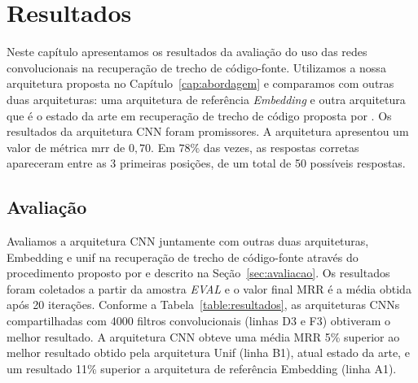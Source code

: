 \chapter{Resultados}
\label{cap:resultados}

Neste capítulo apresentamos os resultados da avaliação do uso das redes convolucionais na recuperação de trecho de código-fonte. Utilizamos a nossa arquitetura proposta no Capítulo~\ref{cap:abordagem} e comparamos com outras duas arquiteturas: uma arquitetura de referência \textit{Embedding} e outra arquitetura que é o estado da arte em recuperação de trecho de código proposta por \cite{cambronero-deep-learning-code-search:2019}. Os resultados da arquitetura CNN foram promissores. A arquitetura apresentou um valor de métrica \acrfull{mrr} de $0,70$. Em $78\%$ das vezes, as respostas corretas apareceram entre as 3 primeiras posições, de um total de 50 possíveis respostas.

\section{Avaliação}
\label{sec:resultados-avaliacao}

Avaliamos a arquitetura CNN juntamente com outras duas arquiteturas, Embedding e \Gls{unif} na recuperação de trecho de código-fonte através do procedimento proposto por \cite{iyer-etal-2016-summarizing} e descrito na Seção~\ref{sec:avaliacao}. Os resultados foram coletados a partir da amostra \emph{EVAL} e o valor final MRR é a média obtida após 20 iterações. Conforme a Tabela~\ref{table:resultados}, as arquiteturas CNNs compartilhadas com 4000 filtros convolucionais (linhas D3 e F3) obtiveram o melhor resultado. A arquitetura CNN obteve uma média MRR 5\% superior ao melhor resultado obtido pela arquitetura Unif (linha B1), atual estado da arte, e um resultado 11\% superior a arquitetura de referência Embedding (linha A1). 

